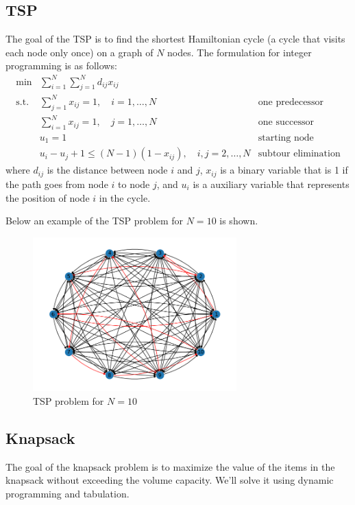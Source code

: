 \subsection{TSP}
The goal of the TSP is to find the shortest Hamiltonian cycle (a cycle that visits each node only once) on a graph of $N$ nodes. The formulation for integer programming is as follows:
\begin{align*}
    \text{min}  & \sum_{i=1}^{N}\sum_{j=1}^{N}d_{ij}x_{ij}                &                            \\
    \text{s.t.} & \sum_{j=1}^{N}x_{ij} = 1, \quad i=1,\ldots,N            & \text{one predecessor}     \\
                & \sum_{i=1}^{N}x_{ij} = 1, \quad j=1,\ldots,N            & \text{one successor}       \\
                & u_1 = 1                                                 & \text{starting node}       \\
                & u_i - u_j +1 \leq (N-1)(1-x_{ij}), \quad i,j=2,\ldots,N & \text{subtour elimination}
\end{align*}
where $d_{ij}$ is the distance between node $i$ and $j$, $x_{ij}$ is a binary variable that is 1 if the path goes from node $i$ to node $j$, and $u_i$ is a auxiliary variable that represents the position of node $i$ in the cycle.

Below an example of the TSP problem for $N=10$ is shown.
\begin{figure}[H]
    \centering
    \includegraphics[width=0.7\textwidth]{lab11/imgs/tsp.png}
    \caption{TSP problem for $N=10$}
    \label{fig:tsp}
\end{figure}

\subsection{Knapsack}
The goal of the knapsack problem is to maximize the value of the items in the knapsack without exceeding the volume capacity. We'll solve it using dynamic programming and tabulation.

